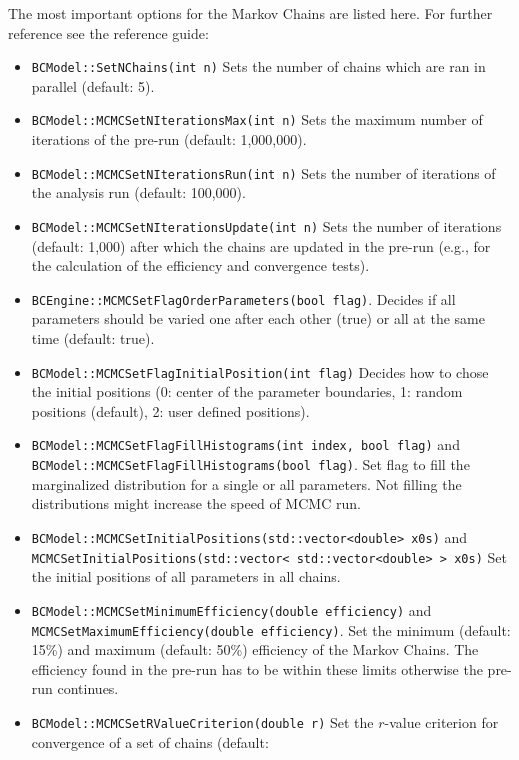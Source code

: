 \documentclass[11pt, a4paper]{article}
\begin{document}
The most important options for the Markov Chains are listed here. For
further reference see the reference guide:
%
\begin{itemize}
\item \verb|BCModel::SetNChains(int n)| Sets the number of chains
  which are ran in parallel (default: 5).
\item \verb|BCModel::MCMCSetNIterationsMax(int n)| Sets the maximum
  number of iterations of the pre-run (default: 1,000,000).
\item \verb|BCModel::MCMCSetNIterationsRun(int n)| Sets the number of
  iterations of the analysis run (default: 100,000).
\item \verb|BCModel::MCMCSetNIterationsUpdate(int n)| Sets the number
  of iterations (default: 1,000) after which the chains are updated in
  the pre-run (e.g., for the calculation of the efficiency and
  convergence tests).
\item \verb|BCEngine::MCMCSetFlagOrderParameters(bool flag)|. Decides
  if all parameters should be varied one after each other (true) or
  all at the same time (default: true).
\item \verb|BCModel::MCMCSetFlagInitialPosition(int flag)| Decides how
  to chose the initial positions (0: center of the parameter
  boundaries, 1: random positions (default), 2: user defined
  positions).
\item \verb|BCModel::MCMCSetFlagFillHistograms(int index, bool flag)| and \\
  \verb|BCModel::MCMCSetFlagFillHistograms(bool flag)|. Set flag to fill the marginalized distribution for a single or all parameters. Not filling the distributions might increase the speed of MCMC run.
\item \verb|BCModel::MCMCSetInitialPositions(std::vector<double> x0s)|
  and \\
  \verb|MCMCSetInitialPositions(std::vector< std::vector<double> > x0s)|
  Set the initial positions of all parameters in all chains.
\item \verb|BCModel::MCMCSetMinimumEfficiency(double efficiency)| and \\
  \verb|MCMCSetMaximumEfficiency(double efficiency)|. Set the minimum
  (default: 15\%) and maximum (default: 50\%) efficiency of the Markov
  Chains. The efficiency found in the pre-run has to be within these
  limits otherwise the pre-run continues.
\item \verb|BCModel::MCMCSetRValueCriterion(double r)| Set the
  $r$-value criterion for convergence of a set of chains (default:

\end{itemize}
\end{document}
